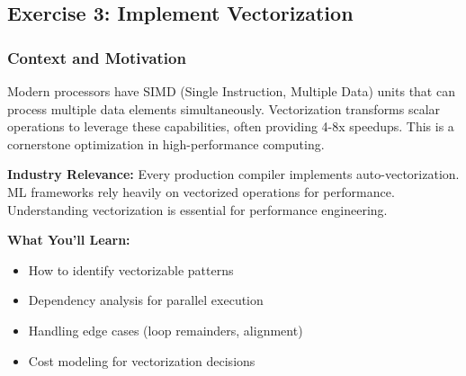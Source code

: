 \documentclass[11pt,a4paper]{article}
\begin{document}
\subsection{Exercise 3: Implement Vectorization}

\subsubsection{Context and Motivation}

Modern processors have SIMD (Single Instruction, Multiple Data) units that can process multiple data elements simultaneously. Vectorization transforms scalar operations to leverage these capabilities, often providing 4-8x speedups. This is a cornerstone optimization in high-performance computing.

\textbf{Industry Relevance:} Every production compiler implements auto-vectorization. ML frameworks rely heavily on vectorized operations for performance. Understanding vectorization is essential for performance engineering.

\textbf{What You'll Learn:}
\begin{itemize}
    \item How to identify vectorizable patterns
    \item Dependency analysis for parallel execution
    \item Handling edge cases (loop remainders, alignment)
    \item Cost modeling for vectorization decisions
\end{itemize}
\end{document}

